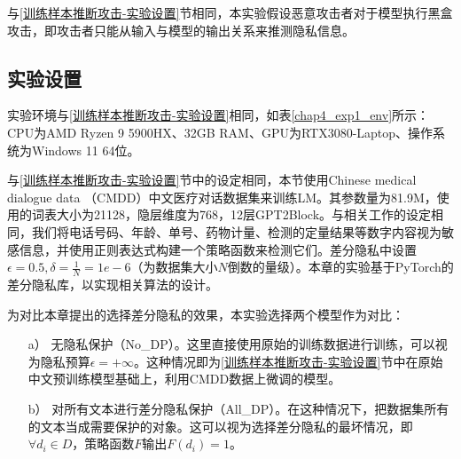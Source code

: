 %
%

与\ref{训练样本推断攻击-实验设置}节相同，本实验假设恶意攻击者对于模型执行黑盒攻击，即攻击者只能从输入与模型的输出关系来推测隐私信息。

\subsection{实验设置} \label{Chap5_Exp_Setting}

实验环境与\ref{训练样本推断攻击-实验设置}相同，如表\ref{chap4_exp1_env}所示：CPU为AMD Ryzen 9 5900HX、32GB RAM、GPU为RTX3080-Laptop、操作系统为Windows 11 64位。

与\ref{训练样本推断攻击-实验设置}节中的设定相同，本节使用Chinese medical dialogue data （CMDD）中文医疗对话数据集来训练LM。其参数量为81.9M，使用的词表大小为21128，隐层维度为768，12层GPT2Block。与相关工作的设定相同\cite{selectivedp}，我们将电话号码、年龄、单号、药物计量、检测的定量结果等数字内容视为敏感信息，并使用正则表达式构建一个策略函数来检测它们。差分隐私中设置$\epsilon=0.5,\delta=\frac{1}{N}=1e-6$（为数据集大小$N$倒数的量级）。本章的实验基于PyTorch的差分隐私库\cite{opacus}，以实现相关算法的设计。

为对比本章提出的选择差分隐私的效果，本实验选择两个模型作为对比：
\begin{itemize}
	\item [a）]
	无隐私保护（No\_DP）。这里直接使用原始的训练数据进行训练，可以视为隐私预算$\epsilon=+\infty$。这种情况即为\ref{训练样本推断攻击-实验设置}节中在原始中文预训练模型基础上，利用CMDD数据上微调的模型。
	\item [b）]
	对所有文本进行差分隐私保护（All\_DP）。在这种情况下，把数据集所有的文本当成需要保护的对象。这可以视为选择差分隐私的最坏情况，即$\forall d_i\in D$，策略函数$F$输出$F(d_i)=1$。
	
\end{itemize}

